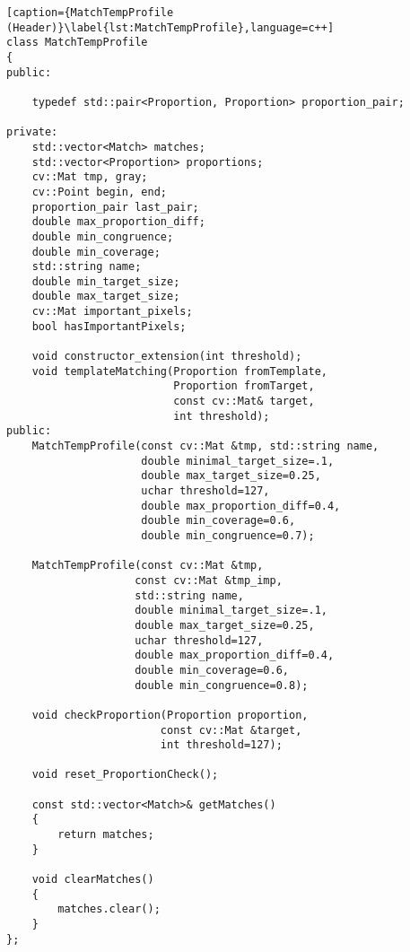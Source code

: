 \begin{lstlisting}[caption={MatchTempProfile (Header)}\label{lst:MatchTempProfile},language=c++]
class MatchTempProfile
{
public:

	typedef std::pair<Proportion, Proportion> proportion_pair;

private:
	std::vector<Match> matches;
	std::vector<Proportion> proportions;
	cv::Mat tmp, gray;
	cv::Point begin, end;
	proportion_pair last_pair;
	double max_proportion_diff;
	double min_congruence;
	double min_coverage;
	std::string name;
	double min_target_size;
	double max_target_size;
	cv::Mat important_pixels;
	bool hasImportantPixels;

	void constructor_extension(int threshold);
	void templateMatching(Proportion fromTemplate,  
	                      Proportion fromTarget,
	                      const cv::Mat& target,
	                      int threshold);
public:
	MatchTempProfile(const cv::Mat &tmp, std::string name, 
	                 double minimal_target_size=.1, 
	                 double max_target_size=0.25, 
	                 uchar threshold=127, 
	                 double max_proportion_diff=0.4, 
	                 double min_coverage=0.6, 
	                 double min_congruence=0.7);

	MatchTempProfile(const cv::Mat &tmp, 
					const cv::Mat &tmp_imp, 
					std::string name, 
					double minimal_target_size=.1, 
					double max_target_size=0.25, 
					uchar threshold=127, 
					double max_proportion_diff=0.4, 
					double min_coverage=0.6, 
					double min_congruence=0.8);

	void checkProportion(Proportion proportion, 
						const cv::Mat &target, 
						int threshold=127);

	void reset_ProportionCheck();

	const std::vector<Match>& getMatches()
	{
		return matches;
	}

	void clearMatches()
	{
		matches.clear();
	}
};
\end{lstlisting}


